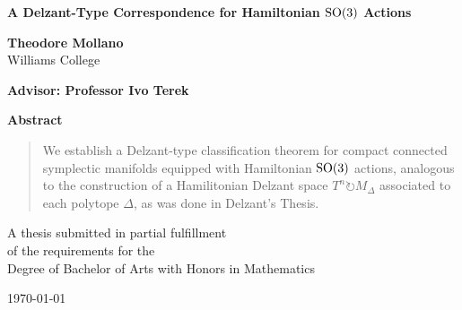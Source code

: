 \documentclass[12pt, oneside]{book}
\begin{document}
\begin{titlepage}
\thispagestyle{empty}
\begin{center}

\vspace*{1.5cm}

{\LARGE \bfseries A Delzant-Type Correspondence for Hamiltonian \texorpdfstring{${\rm SO}(3)$}{SO(3)} Actions \par}

\vspace{1.5cm}

{\large \textbf{Theodore Mollano}}\\
Williams College \\

\vspace{1cm}

\textbf{Advisor: Professor Ivo Terek}

\vspace{1.5cm}

\textbf{Abstract}
\begin{quote}
We establish a Delzant-type classification theorem for compact connected symplectic manifolds equipped with Hamiltonian ${\rm SO}(3)$ actions, analogous to the construction of a Hamilitonian Delzant space $T^{n} \circlearrowright M_{\Delta}$ associated to each polytope $\Delta$, as was done in Delzant's Thesis. 
\end{quote}

\vfill

A thesis submitted in partial fulfillment\\
of the requirements for the\\
Degree of Bachelor of Arts with Honors in Mathematics

\vspace{1cm}

\today

\end{center}
\end{titlepage}

\frontmatter 


\end{document}

